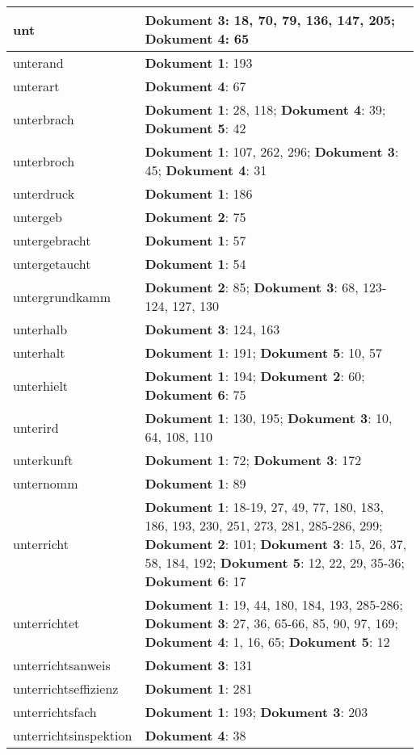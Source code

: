 \documentclass[a5paper]{article}
\begin{document}
\begin{longtable}[l]{|l|p{3in}|}
\hline
unt & \textbf{Dokument 3}: 18, 70, 79, 136, 147, 205; \textbf{Dokument 4}: 65 \\
\hline
unterand & \textbf{Dokument 1}: 193 \\
\hline
unterart & \textbf{Dokument 4}: 67 \\
\hline
unterbrach & \textbf{Dokument 1}: 28, 118; \textbf{Dokument 4}: 39; \textbf{Dokument 5}: 42 \\
\hline
unterbroch & \textbf{Dokument 1}: 107, 262, 296; \textbf{Dokument 3}: 45; \textbf{Dokument 4}: 31 \\
\hline
unterdruck & \textbf{Dokument 1}: 186 \\
\hline
untergeb & \textbf{Dokument 2}: 75 \\
\hline
untergebracht & \textbf{Dokument 1}: 57 \\
\hline
untergetaucht & \textbf{Dokument 1}: 54 \\
\hline
untergrundkamm & \textbf{Dokument 2}: 85; \textbf{Dokument 3}: 68, 123-124, 127, 130 \\
\hline
unterhalb & \textbf{Dokument 3}: 124, 163 \\
\hline
unterhalt & \textbf{Dokument 1}: 191; \textbf{Dokument 5}: 10, 57 \\
\hline
unterhielt & \textbf{Dokument 1}: 194; \textbf{Dokument 2}: 60; \textbf{Dokument 6}: 75 \\
\hline
unterird & \textbf{Dokument 1}: 130, 195; \textbf{Dokument 3}: 10, 64, 108, 110 \\
\hline
unterkunft & \textbf{Dokument 1}: 72; \textbf{Dokument 3}: 172 \\
\hline
unternomm & \textbf{Dokument 1}: 89 \\
\hline
unterricht & \textbf{Dokument 1}: 18-19, 27, 49, 77, 180, 183, 186, 193, 230, 251, 273, 281, 285-286, 299; \textbf{Dokument 2}: 101; \textbf{Dokument 3}: 15, 26, 37, 58, 184, 192; \textbf{Dokument 5}: 12, 22, 29, 35-36; \textbf{Dokument 6}: 17 \\
\hline
unterrichtet & \textbf{Dokument 1}: 19, 44, 180, 184, 193, 285-286; \textbf{Dokument 3}: 27, 36, 65-66, 85, 90, 97, 169; \textbf{Dokument 4}: 1, 16, 65; \textbf{Dokument 5}: 12 \\
\hline
unterrichtsanweis & \textbf{Dokument 3}: 131 \\
\hline
unterrichtseffizienz & \textbf{Dokument 1}: 281 \\
\hline
unterrichtsfach & \textbf{Dokument 1}: 193; \textbf{Dokument 3}: 203 \\
\hline
unterrichtsinspektion & \textbf{Dokument 4}: 38 \\

\end{longtable}
\end{document}
